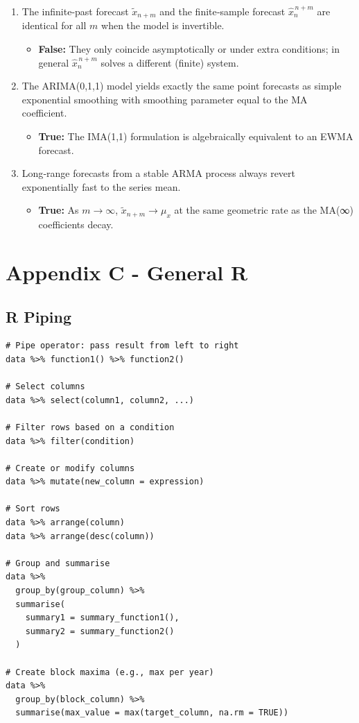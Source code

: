 \documentclass[11pt]{article}
\begin{document}
\begin{enumerate}
  \item The infinite‐past forecast \(\tilde x_{n+m}\) and the finite‐sample forecast \(\hat x_{n}^{\,n+m}\) are identical for all \(m\) when the model is invertible.
  \begin{itemize}
    \item \textbf{False:} They only coincide asymptotically or under extra conditions; in general \(\hat x_{n}^{\,n+m}\) solves a different (finite) system.
  \end{itemize}

  \item The ARIMA(0,1,1) model yields exactly the same point forecasts as simple exponential smoothing with smoothing parameter equal to the MA coefficient.
  \begin{itemize}
    \item \textbf{True:} The IMA(1,1) formulation is algebraically equivalent to an EWMA forecast.
  \end{itemize}

  \item Long‐range forecasts from a stable ARMA process always revert exponentially fast to the series mean.
  \begin{itemize}
    \item \textbf{True:} As \(m\to\infty\), \(\tilde x_{n+m}\to\mu_x\) at the same geometric rate as the MA(∞) coefficients decay.
  \end{itemize}
\end{enumerate}

\newpage 

\section{Appendix C - General R}
\subsection{R Piping}
\begin{lstlisting}
# Pipe operator: pass result from left to right
data %>% function1() %>% function2()

# Select columns
data %>% select(column1, column2, ...)

# Filter rows based on a condition
data %>% filter(condition)

# Create or modify columns
data %>% mutate(new_column = expression)

# Sort rows
data %>% arrange(column)
data %>% arrange(desc(column))

# Group and summarise
data %>%
  group_by(group_column) %>%
  summarise(
    summary1 = summary_function1(),
    summary2 = summary_function2()
  )

# Create block maxima (e.g., max per year)
data %>%
  group_by(block_column) %>%
  summarise(max_value = max(target_column, na.rm = TRUE))
\end{lstlisting} 
\end{document}
